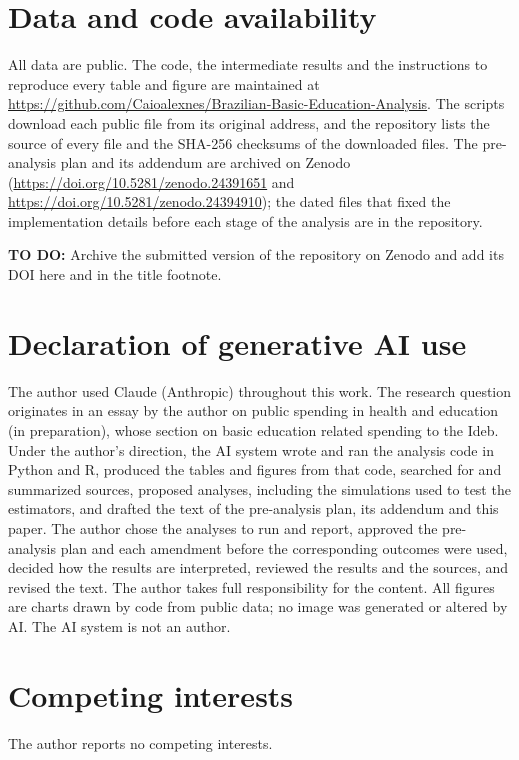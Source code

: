 \documentclass[12pt,letterpaper]{article}
\newcommand{\todo}[1]{\par\noindent\colorbox{yellow!25}{\parbox{\dimexpr\linewidth-2\fboxsep}{\small\textbf{TO DO:} #1}}\par}
\begin{document}
\section*{Data and code availability}
All data are public. The code, the intermediate results and the instructions to reproduce every table and figure are maintained at \url{https://github.com/Caioalexnes/Brazilian-Basic-Education-Analysis}. The scripts download each public file from its original address, and the repository lists the source of every file and the SHA-256 checksums of the downloaded files. The pre-analysis plan and its addendum are archived on Zenodo (\url{https://doi.org/10.5281/zenodo.24391651} and \url{https://doi.org/10.5281/zenodo.24394910}); the dated files that fixed the implementation details before each stage of the analysis are in the repository.
\todo{Archive the submitted version of the repository on Zenodo and add its DOI here and in the title footnote.}

\section*{Declaration of generative AI use}
The author used Claude (Anthropic) throughout this work. The research question originates in an essay by the author on public spending in health and education (in preparation), whose section on basic education related spending to the Ideb. Under the author's direction, the AI system wrote and ran the analysis code in Python and R, produced the tables and figures from that code, searched for and summarized sources, proposed analyses, including the simulations used to test the estimators, and drafted the text of the pre-analysis plan, its addendum and this paper. The author chose the analyses to run and report, approved the pre-analysis plan and each amendment before the corresponding outcomes were used, decided how the results are interpreted, reviewed the results and the sources, and revised the text. The author takes full responsibility for the content. All figures are charts drawn by code from public data; no image was generated or altered by AI. The AI system is not an author.

\section*{Competing interests}
The author reports no competing interests.




\processdelayedfloats
\clearpage
\end{document}
